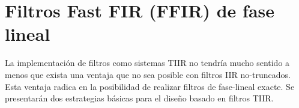 \section{Filtros Fast FIR (FFIR) de fase lineal}
    La implementación de filtros como sistemas TIIR no tendría mucho sentido a menos que exista una ventaja que no sea posible con filtros IIR no-truncados. Esta ventaja radica en la posibilidad de realizar filtros de fase-lineal exacte. Se presentarán dos estrategias básicas para el diseño basado en filtros TIIR.

    
    
    
    

